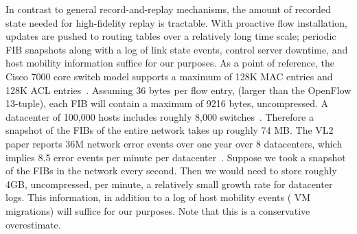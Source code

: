 { In contrast to general record-and-replay
mechanisms, the amount of recorded state needed for
high-fidelity replay is tractable. With proactive flow installation,
updates are pushed to routing tables over a relatively long time scale; periodic
FIB snapshots along with a log of link state events, control server
downtime, and host mobility information suffice for our purposes. As a point of reference, the Cisco 7000
core switch model supports a maximum of 128K MAC entries and
128K ACL entries~\cite{cisco7000}. Assuming 36 bytes per flow entry,
(larger than the OpenFlow 13-tuple), each FIB will contain a maximum of 9216
bytes, uncompressed. A datacenter of 100,000
hosts includes roughly 8,000
switches~\cite{Al-Fares:2008:SCD:1402958.1402967}.
Therefore a snapshot of the FIBs of the entire network takes up roughly 74 MB.
The VL2 paper reports 36M network error events over one year over 8
datacenters, which implies 8.5 error events per minute per
datacenter~\cite{Greenberg:2009:VSF:1592568.1592576}.
Suppose we took a snapshot of the FIBs in the network every second.
Then we would need to store roughly 4GB, uncompressed, per minute, a relatively small growth
rate for datacenter logs. This information, in addition to a log of host
mobility events (\eg{} VM migrations) will suffice for our purposes. Note that this is a conservative overestimate.



}
